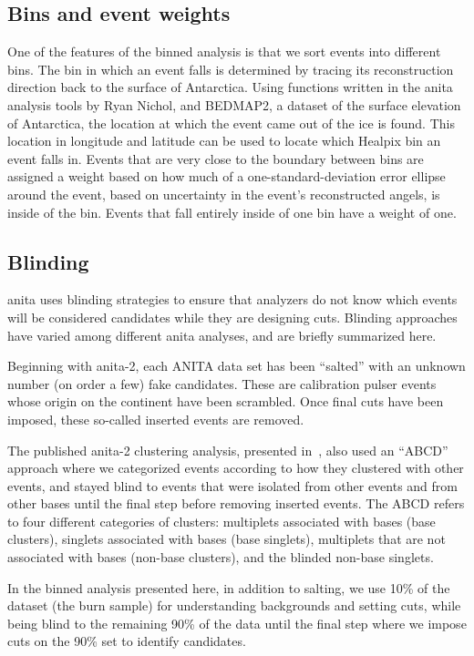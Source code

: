 \subsection{Bins and event weights}

One of the features of the binned analysis is that we sort events into different bins.  The bin in which an event falls is determined by tracing its reconstruction direction back to the surface of Antarctica.  Using functions written in the \gls{anita} analysis tools by Ryan Nichol, and BEDMAP2, a dataset of the surface elevation of Antarctica, the location at which the event came out of the ice is found.  This location in longitude and latitude can be used to locate which Healpix bin an event falls in.  Events that are very close to the boundary between bins are assigned a weight based on how much of a one-standard-deviation error ellipse around the event, based on uncertainty in the event's reconstructed angels, is inside of the bin.  Events that fall entirely inside of one bin have a weight of one. 

\subsection{Blinding}

\gls{anita} uses blinding strategies to ensure that analyzers do not know which events will 
be considered candidates while they are designing cuts.  Blinding approaches have    
varied among different \gls{anita} analyses, and are briefly summarized here. 

Beginning with \gls{anita}-2, each ANITA data set has been ``salted'' with an unknown 
number (on order a few) fake candidates.  These are calibration pulser events whose origin on the continent have been scrambled.  Once final cuts have been imposed, these so-called inserted events are removed.

The published \gls{anita}-2 clustering analysis, presented in~\cite{anita2}, also used an ``ABCD'' approach where we categorized events according to how they clustered with other events, and stayed blind to events that were isolated from other events and from other bases until the final step before removing inserted events.  The ABCD refers to four different categories of clusters:  multiplets associated with bases (base clusters), singlets associated with bases (base singlets), multiplets that are not associated with bases (non-base clusters), and the blinded non-base singlets.

In the binned analysis presented here, in addition to salting, we use 10\% of the dataset (the burn sample) for understanding backgrounds and setting cuts, while being blind to the remaining 90\% of the data until the final step where we impose cuts on the 90\% set to identify candidates. 

